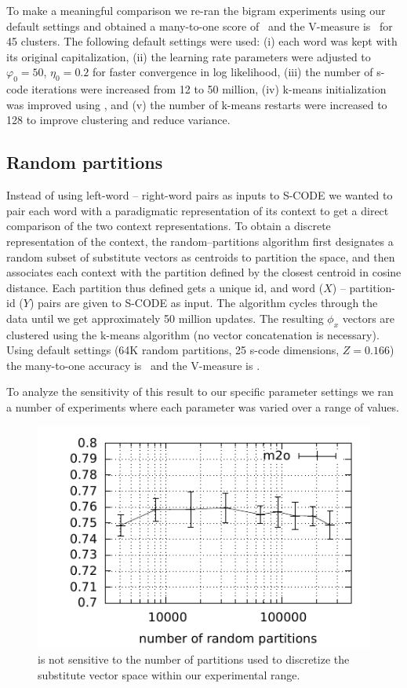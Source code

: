 To make a meaningful comparison we re-ran the bigram experiments using
our default settings and obtained a many-to-one score of \bgmto\ 
and the V-measure is \bgvm\  for 45 clusters.  The following
default settings were used: (i) each word was kept with its original
capitalization, (ii) the learning rate parameters were adjusted to
$\varphi_0=50$, $\eta_0=0.2$ for faster convergence in log likelihood,
(iii) the number of s-code iterations were increased from 12 to 50
million, (iv) k-means initialization was improved using
\cite{arthur2007k}, and (v) the number of k-means restarts were
increased to 128 to improve clustering and reduce variance.

\subsection{Random partitions}\label{sec:rpart}

Instead of using left-word -- right-word pairs as inputs to S-CODE we
wanted to pair each word with a paradigmatic representation of its
context to get a direct comparison of the two context representations.
To obtain a discrete representation of the context, the
random--partitions algorithm first designates a random subset of
substitute vectors as centroids to partition the space, and then
associates each context with the partition defined by the closest
centroid in cosine distance.  Each partition thus defined gets a
unique id, and word ($X$) -- partition-id ($Y$) pairs are given to
S-CODE as input.  The algorithm cycles through the data until we get
approximately 50 million updates.  The resulting $\phi_x$ vectors are
clustered using the k-means algorithm (no vector concatenation is
necessary).  Using default settings (64K random partitions, 25 s-code
dimensions, $Z=0.166$) the many-to-one accuracy is \rpmto\ and
the V-measure is \rpvm.

To analyze the sensitivity of this result to our specific parameter
settings we ran a number of experiments where each parameter was
varied over a range of values.

\begin{figure}[ht] \centering
\includegraphics[width=\linewidth]{plot-p.pdf}
\caption{\mto is not sensitive to the number of partitions used to
  discretize the substitute vector space within our experimental
  range.}
\label{plot-p}
\end{figure}

